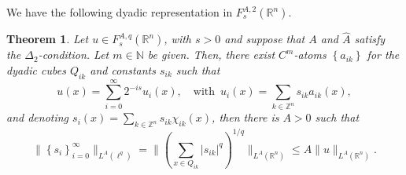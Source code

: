 \documentclass[leqno,twoside, 12pt]{amsart}
\theoremstyle{plain}
\numberwithin{equation}{section} \numberwithin{figure}{section}
\newtheorem{theorem}{Theorem}[section]
\theoremstyle{definition}
\newcommand{\R}{\mathbb R}
\numberwithin{equation}{section}
\begin{document}
We have the following dyadic representation in $F_s^{A, 2}(\R^n)$. %
\begin{theorem}\label{atomic decomposition}
Let $u\in F_s^{A, q}(\R^n)$, with $s>0$ and suppose that $A$ and $\hat A$ satisfy the $\Delta_2$-condition. Let $m\in \mathbb{N}$ be given. Then, there exist $C^m$-atoms $\left\lbrace a_{ik}\right\rbrace$ for the dyadic cubes $Q_{ik}$ and constants $s_{ik}$ such that
\begin{equation}\label{first dec}
u(x)=\sum_{i=0}^\infty 2^{-is}u_i(x),\quad \text{with }\,u_i(x)=\sum_{k\in \mathbb{Z}^n}s_{ik}a_{ik}(x),
\end{equation}and denoting $s_{i}(x)=\sum_{k\in \mathbb{Z}^n}s_{ik}\chi_{ik}(x)$, then there is $A>0$ such that
\begin{equation}\label{estimeta l}
\|\left\lbrace s_i \right\rbrace_{i=0}^\infty\|_{L^A(\ell^q)} =\bigg\|\left(\sum_{x\in Q_{ik}}|s_{ik}|^q \right)^{1/q} \bigg\|_{L^A(\R^n)}\leq A\|u\|_{L^{A}(\R^n)}.
\end{equation}
\end{theorem}
\end{document}
